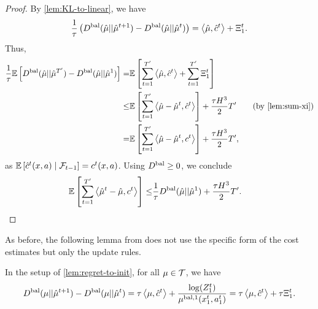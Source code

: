 \begin{proof}
    By \cref{lem:KL-to-linear}, we have 
    \begin{align*}
        \frac{1}{\tau} \left( D^{\text{bal}}(\hat{\mu} || \hat{\mu}^{t+1}) - D^{\text{bal}}(\hat{\mu} || \hat{\mu}^t) \right) = \left\langle \hat{\mu}, \hat{c}^t \right\rangle + \Xi_1^t.
    \end{align*}
    Thus,
    \begin{align*}
        \frac{1}{\tau} \exptn\rectangular{\Dbal(\muHat || \muHat^{T'}) - \Dbal(\muHat || \muHat^1)} =& \exptn\rectangular{\sum_{t=1}^{T'} \inner{\muHat}{\cHat^t} + \sum_{t=1}^{T'} \Xi_1^t}\\
        \leq& \exptn\rectangular{\sum_{t=1}^{T'} \inner{\muHat-\muHat^t}{\cHat^t}} + \frac{\tau H^3}{2} T'\tag{by \cref{lem:sum-xi}}\\
        =& \exptn\rectangular{\sum_{t=1}^{T'} \inner{\muHat-\muHat^t}{c^t}} + \frac{\tau H^3}{2} T',
    \end{align*}
    as $\mathbb{E}\left[ \hat{c}^t(x,a) \mid \mathcal{F}_{t-1} \right] = c^t(x,a)$. Using $D^{\text{bal}} \geq 0$, we conclude
    \begin{align*}
        \mathbb{E}\left[  \sum_{t=1}^{T'} \left\langle \hat{\mu}^t-\hat{\mu}, c^t \right\rangle  \right] \leq& \frac{1}{\tau} D^{\text{bal}}(\hat{\mu}||\hat{\mu}^1) + \frac{\tau H^3}{2} T'.
    \end{align*}
\end{proof}

As before, the following lemma from \citet[Lemma D.7]{bai2022near} does not use the specific form of the cost estimates but only the update rules.
\begin{lemma} \label{lem:KL-to-linear}
    In the setup of \cref{lem:regret-to-init}, for all $\mu \in \mathcal{T}$, we have
    \begin{align*}
        D^{\text{bal}}(\mu||\hat{\mu}^{t+1}) - D^{\text{bal}}(\mu||\hat{\mu}^t) = \tau \left\langle \mu, \hat{c}^t \right\rangle + \frac{\log(Z^t_1)}{\mu^{\text{bal},1}(x_1^t,a_1^t)}=\tau \left\langle \mu, \hat{c}^t \right\rangle + \tau \Xi_1^t.
    \end{align*}
\end{lemma}

